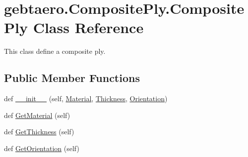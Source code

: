 \hypertarget{classgebtaero_1_1_composite_ply_1_1_composite_ply}{}\section{gebtaero.\+Composite\+Ply.\+Composite\+Ply Class Reference}
\label{classgebtaero_1_1_composite_ply_1_1_composite_ply}


This class define a composite ply.  


\subsection*{Public Member Functions}
\begin{DoxyCompactItemize}
\item 
def \hyperlink{classgebtaero_1_1_composite_ply_1_1_composite_ply_a1165011eca12a4b958aee5cfda595258}{\+\_\+\+\_\+init\+\_\+\+\_\+} (self, \hyperlink{classgebtaero_1_1_composite_ply_1_1_composite_ply_a5ec1ca6af4be2e10bab777f29f469e3e}{Material}, \hyperlink{classgebtaero_1_1_composite_ply_1_1_composite_ply_a0356871876ebf481a0d252f6db1171da}{Thickness}, \hyperlink{classgebtaero_1_1_composite_ply_1_1_composite_ply_a17a90c6f267e88387ac5c06a3dad1cc7}{Orientation})
\item 
def \hyperlink{classgebtaero_1_1_composite_ply_1_1_composite_ply_ae6cc2be5f3b6f81d239215f92db1e410}{Get\+Material} (self)
\item 
def \hyperlink{classgebtaero_1_1_composite_ply_1_1_composite_ply_a87b7989f6e41a5c97d6401d429002731}{Get\+Thickness} (self)
\item 
def \hyperlink{classgebtaero_1_1_composite_ply_1_1_composite_ply_ae60dbb9255f4aac7c6b455ea0f4ea282}{Get\+Orientation} (self)
\end{DoxyCompactItemize}
